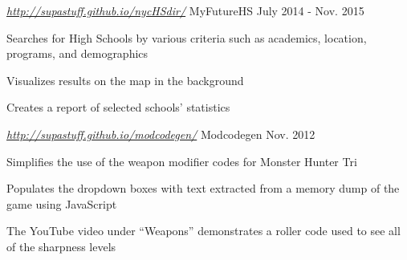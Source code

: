 \begin{cventries}
  \cventry
  {\textit{\url{http://supastuff.github.io/nycHSdir/} } }
    {MyFutureHS}
    {July 2014 - Nov. 2015}
    {}
    {
      \begin{cvitems}
        \item {Searches for High Schools by various criteria such as academics, location, programs, and demographics}
        \item {Visualizes results on the map in the background}
        \item {Creates a report of selected schools’ statistics}
      \end{cvitems}
    }
  \cventry
  {\textit{\url{http://supastuff.github.io/modcodegen/} } }
    {Modcodegen}
    {Nov. 2012}
    {}
    {
      \begin{cvitems}
        \item {Simplifies the use of the weapon modifier codes for Monster Hunter Tri}
        \item {Populates the dropdown boxes with text extracted from a memory dump of the game using JavaScript}
        \item {The YouTube video under “Weapons” demonstrates a roller code used to see all of the sharpness levels}
      \end{cvitems}
    }

\end{cventries}

